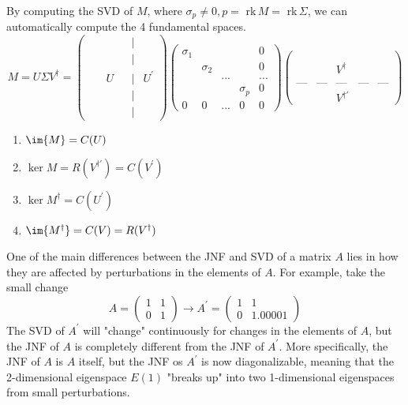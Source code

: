  By computing the SVD of $M$, where $\sigma_p \neq 0, p =$ rk$\,M = $ rk$\,\Sigma$, we can automatically compute the 4 fundamental spaces. 
  \begin{equation}
    M = U \Sigma V^\dagger = \begin{pmatrix}&&&&|&\\&&&&|&\\&&U&&|&U^\prime\\&&&&|&\\&&&&|&
    \end{pmatrix} \begin{pmatrix}
    \sigma_1&&&&0\\
    &\sigma_2&&&0\\
    &&...&&...\\
    &&&\sigma_p&0\\
    0&0&...&0&0
    \end{pmatrix}\begin{pmatrix}
    &&&&\\&&&&\\&&V^\dagger&&\\&&&&\\\text{---}&\text{---}&\text{---}&\text{---}&\text{---}
    \\&&V^{\dagger \prime}&&
    \end{pmatrix}
  \end{equation}
  \begin{enumerate}
    \item $\im{M} = C(U)$
    \item $\ker{M} = R(V^{\dagger \prime}) = C(V^\prime)$
    \item $\ker{M^\dagger} = C(U^\prime)$
    \item $\im{M^\dagger} = C(V) = R(V^\dagger)$
  \end{enumerate}

  One of the main differences between the JNF and SVD of a matrix $A$ lies in how they are affected by perturbations in the elements of $A$. For example, take the small change 
  \begin{equation}
    A = \begin{pmatrix}
    1 & 1\\
    0 & 1
    \end{pmatrix} \longrightarrow A^\prime  = \begin{pmatrix}
    1 & 1 \\
    0 & 1.00001
    \end{pmatrix}
  \end{equation}
  The SVD of $A^\prime$ will "change" continuously for changes in the elements of $A$, but the JNF of $A$ is completely different from the JNF of $A^\prime$. More specifically, the JNF of $A$ is $A$ itself, but the JNF os $A^\prime$ is now diagonalizable, meaning that the 2-dimensional eigenspace $E(1)$ "breaks up" into two 1-dimensional eigenspaces from small perturbations. 

